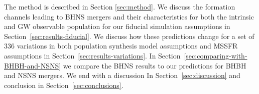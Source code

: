 \documentclass[twocolumn]{aastex63}
\newcommand\bhnsSingle{BHNS\xspace}
\newcommand{\Nmodels}{\ensuremath{336}\xspace}
\begin{document}
%
%


 The method is described in Section \ref{sec:method}. We discuss the formation channels leading to \bhnsSingle mergers and their characteristics for both the intrinsic and \ac{GW} observable population for our fiducial simulation assumptions in Section~\ref{sec:results-fiducial}.   We discuss how these predictions change for a set of  \Nmodels variations in both population synthesis model assumptions and \ac{MSSFR} assumptions in Section~\ref{sec:results-variations}. In Section~\ref{sec:comparing-with-BHBH-and-NSNS} we compare the \bhnsSingle results to our predictions for \ac{BHBH} and \ac{NSNS} mergers. We end with a discussion In Section~\ref{sec:discussion} and conclusion in Section~\ref{sec:conclusions}.  
\end{document}
